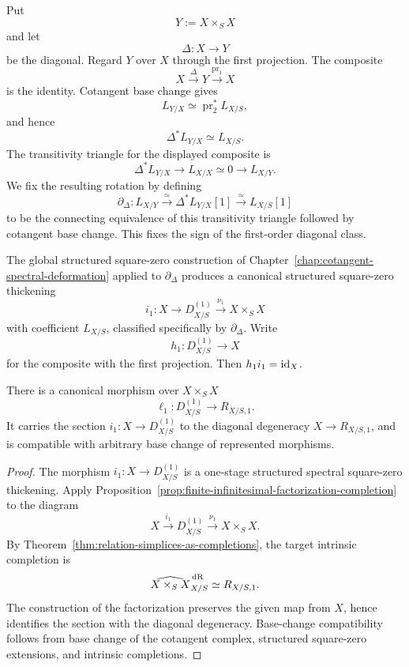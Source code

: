 \begin{construction}
\label{constr:first-diagonal-thickening}
Put
\[
    Y:=X\times_SX
\]
and let
\[
    \Delta:X\longrightarrow Y
\]
be the diagonal.  Regard \(Y\) over \(X\) through the first projection.  The composite
\[
    X\xrightarrow{\Delta}Y\xrightarrow{\operatorname{pr}_1}X
\]
is the identity.  Cotangent base change gives
\[
    L_{Y/X}
    \simeq
    \operatorname{pr}_2^*L_{X/S},
\]
and hence
\[
    \Delta^*L_{Y/X}\simeq L_{X/S}.
\]
The transitivity triangle for the displayed composite is
\[
    \Delta^*L_{Y/X}
    \longrightarrow
    L_{X/X}\simeq0
    \longrightarrow
    L_{X/Y}.
\]
We fix the resulting rotation by defining
\[
\boxed{
    \partial_\Delta:
    L_{X/Y}
    \xrightarrow{\simeq}
    \Delta^*L_{Y/X}[1]
    \xrightarrow{\simeq}
    L_{X/S}[1]
}
\]
to be the connecting equivalence of this transitivity triangle followed by
cotangent base change.  This fixes the sign of the first-order diagonal class.

The global structured square-zero construction of
Chapter~\ref{chap:cotangent-spectral-deformation} applied to
\(\partial_\Delta\) produces a canonical structured square-zero thickening
\[
\boxed{
    i_1:X\longrightarrow D^{(1)}_{X/S}
    \xrightarrow{\nu_1}
    X\times_SX
}
\]
with coefficient \(L_{X/S}\), classified specifically by
\(\partial_\Delta\).  Write
\[
    h_1:D^{(1)}_{X/S}\longrightarrow X
\]
for the composite with the first projection.  Then \(h_1i_1=\operatorname{id}_X\).
\end{construction}

\begin{proposition}
\label{prop:first-order-neighbourhood-to-relation}
There is a canonical morphism over \(X\times_SX\)
\[
\boxed{
    \ell_1:
    D^{(1)}_{X/S}
    \longrightarrow
    R_{X/S,1}.
}
\]
It carries the section \(i_1:X\to D^{(1)}_{X/S}\) to the diagonal degeneracy
\(X\to R_{X/S,1}\), and is compatible with arbitrary base change of represented morphisms.
\end{proposition}

\begin{proof}
The morphism \(i_1:X\to D^{(1)}_{X/S}\) is a one-stage structured spectral square-zero thickening.
Apply Proposition~\ref{prop:finite-infinitesimal-factorization-completion} to the diagram
\[
    X\xrightarrow{i_1}D^{(1)}_{X/S}
    \xrightarrow{\nu_1}X\times_SX.
\]
By Theorem~\ref{thm:relation-simplices-as-completions}, the target intrinsic completion is
\[
    \widehat{X\times_SX}^{\,\mathrm{dR}}_{X/S}
    \simeq
    R_{X/S,1}.
\]
The construction of the factorization preserves the given map from \(X\), hence identifies the
section with the diagonal degeneracy.  Base-change compatibility follows from base change of the
cotangent complex, structured square-zero extensions, and intrinsic completions.
\end{proof}

